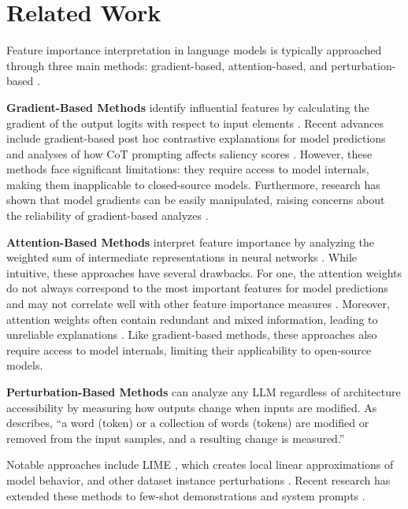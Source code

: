 \section{Related Work}
Feature importance interpretation in language models is typically approached through three main methods: gradient-based, attention-based, and perturbation-based \cite{choudhary2022interpretation}.

\textbf{Gradient-Based Methods} identify influential features by calculating the gradient of the output logits with respect to input elements \cite{wallace-etal-2019-allennlp}. Recent advances include gradient-based post hoc contrastive explanations for model predictions \cite{yin2022interpreting,ferrando-etal-2023-explaining} and analyses of how CoT prompting affects saliency scores \cite{wu2023analyzing}. However, these methods face significant limitations: they require access to model internals, making them inapplicable to closed-source models. Furthermore, research has shown that model gradients can be easily manipulated, raising concerns about the reliability of gradient-based analyzes \cite{wang2020gradient}.

\textbf{Attention-Based Methods} interpret feature importance by analyzing the weighted sum of intermediate representations in neural networks \cite{modarressi2022globenc, tenney2020language, ferrando-etal-2022-measuring}. While intuitive, these approaches have several drawbacks. For one, the attention weights do not always correspond to the most important features for model predictions \cite{jain-wallace-2019-attention} and may not correlate well with other feature importance measures \cite{ethayarajh-jurafsky-2021-attention}. Moreover, attention weights often contain redundant and mixed information, leading to unreliable explanations \cite{bastings-filippova-2020-elephant}. Like gradient-based methods, these approaches also require access to model internals, limiting their applicability to open-source models.

\textbf{Perturbation-Based Methods} can analyze any LLM regardless of architecture accessibility by measuring how outputs change when inputs are modified. As \cite{choudhary2022interpretation} describes, ``a word (token) or a collection of words (tokens) are modified or removed from the input samples, and a resulting change is measured.''

Notable approaches include LIME \cite{ribeiro2016should}, which creates local linear approximations of model behavior, and other dataset instance perturbations \cite{zafar2019dlime}. Recent research has extended these methods to few-shot demonstrations \cite{liu2023towards} and system prompts \cite{hackmann2024word, yin2023did}.

